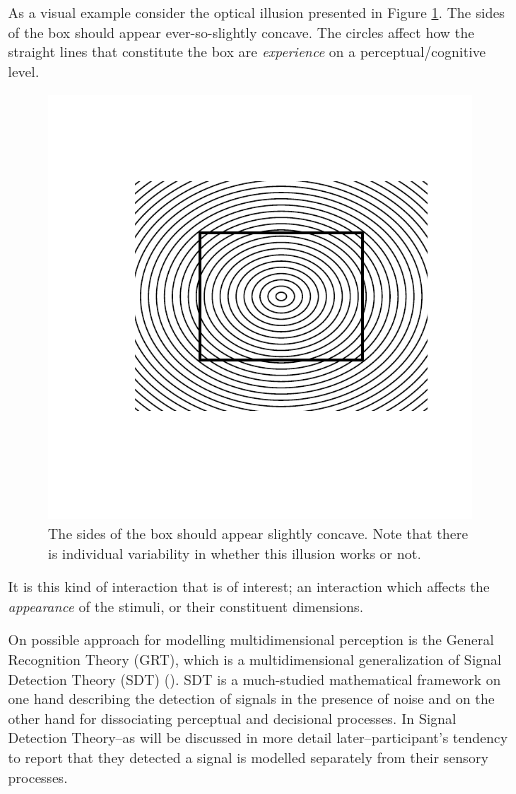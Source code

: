 \documentclass{article}\usepackage{knitr}
\begin{document}
As a visual example consider the optical illusion presented in Figure \ref{fig:opt_illusion}. The sides of the box should appear ever-so-slightly concave. The circles affect how the straight lines that constitute the box are \textit{experience} on a perceptual/cognitive level.

\begin{figure}[!htb]
	\centering
\begin{knitrout}
\color{fgcolor}
\includegraphics[width=\maxwidth]{figure/unnamed-chunk-2-1} 
\end{knitrout}
	\caption{The sides of the box should appear slightly concave. Note that there is individual variability in whether this illusion works or not.}
	\label{fig:opt_illusion}
\end{figure} 

It is this kind of interaction that is of interest; an interaction which affects the \textit{appearance} of the stimuli, or their constituent dimensions.

On possible approach for modelling multidimensional perception is the General Recognition Theory (GRT), which is a multidimensional generalization of Signal Detection Theory (SDT) (\citealp{wickens2002,ashby1986, ashby2015}). SDT is a much-studied mathematical framework on one hand describing the detection of signals in the presence of noise and on the other hand for dissociating perceptual and decisional processes. In Signal Detection Theory--as will be discussed in more detail later--participant's tendency to report that they detected a signal is modelled separately from their sensory processes.
\end{document}

